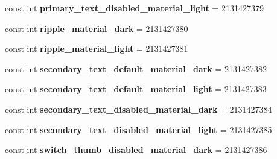 \begin{DoxyCompactItemize}
\item 
\mbox{\label{class_pinned_app_1_1_droid_1_1_resource_1_1_color_a613ff4452dfef819ed24fdf48adf937a}} 
const int {\bfseries primary\+\_\+text\+\_\+disabled\+\_\+material\+\_\+light} = 2131427379
\item 
\mbox{\label{class_pinned_app_1_1_droid_1_1_resource_1_1_color_a851ff9440e25e901a70e406f51cce757}} 
const int {\bfseries ripple\+\_\+material\+\_\+dark} = 2131427380
\item 
\mbox{\label{class_pinned_app_1_1_droid_1_1_resource_1_1_color_ad639e73d93cc4f3bb596eae835d7d252}} 
const int {\bfseries ripple\+\_\+material\+\_\+light} = 2131427381
\item 
\mbox{\label{class_pinned_app_1_1_droid_1_1_resource_1_1_color_aacea24134ec7b5128dfcd9e3025bf6fc}} 
const int {\bfseries secondary\+\_\+text\+\_\+default\+\_\+material\+\_\+dark} = 2131427382
\item 
\mbox{\label{class_pinned_app_1_1_droid_1_1_resource_1_1_color_a017e934549bf42eeb80780db66a9f03e}} 
const int {\bfseries secondary\+\_\+text\+\_\+default\+\_\+material\+\_\+light} = 2131427383
\item 
\mbox{\label{class_pinned_app_1_1_droid_1_1_resource_1_1_color_ad47a8dd25a2cef3b982c624310b7008c}} 
const int {\bfseries secondary\+\_\+text\+\_\+disabled\+\_\+material\+\_\+dark} = 2131427384
\item 
\mbox{\label{class_pinned_app_1_1_droid_1_1_resource_1_1_color_a52642430760156ee1afd021fd1bb8bcb}} 
const int {\bfseries secondary\+\_\+text\+\_\+disabled\+\_\+material\+\_\+light} = 2131427385
\item 
\mbox{\label{class_pinned_app_1_1_droid_1_1_resource_1_1_color_af45fd441cff4bea7c5467e5fdb439bf2}} 
const int {\bfseries switch\+\_\+thumb\+\_\+disabled\+\_\+material\+\_\+dark} = 2131427386

\end{DoxyCompactItemize}
